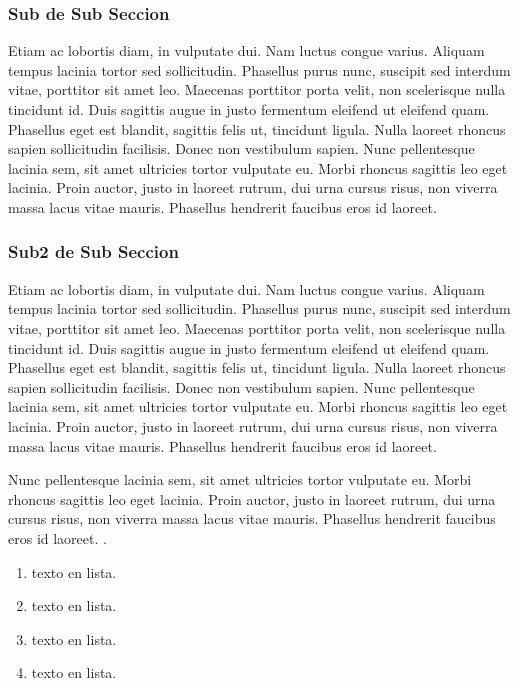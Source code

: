 \subsubsection{Sub de Sub Seccion}


Etiam ac lobortis diam, in vulputate dui. Nam luctus congue varius. Aliquam tempus lacinia tortor sed sollicitudin. Phasellus purus nunc, suscipit sed interdum vitae, porttitor sit amet leo. Maecenas porttitor porta velit, non scelerisque nulla tincidunt id. Duis sagittis augue in justo fermentum eleifend ut eleifend quam. Phasellus eget est blandit, sagittis felis ut, tincidunt ligula. Nulla laoreet rhoncus sapien sollicitudin facilisis. Donec non vestibulum sapien. Nunc pellentesque lacinia sem, sit amet ultricies tortor vulputate eu. Morbi rhoncus sagittis leo eget lacinia. Proin auctor, justo in laoreet rutrum, dui urna cursus risus, non viverra massa lacus vitae mauris. Phasellus hendrerit faucibus eros id laoreet. 


\subsubsection{Sub2 de Sub Seccion}


Etiam ac lobortis diam, in vulputate dui. Nam luctus congue varius. Aliquam tempus lacinia tortor sed sollicitudin. Phasellus purus nunc, suscipit sed interdum vitae, porttitor sit amet leo. Maecenas porttitor porta velit, non scelerisque nulla tincidunt id. Duis sagittis augue in justo fermentum eleifend ut eleifend quam. Phasellus eget est blandit, sagittis felis ut, tincidunt ligula. Nulla laoreet rhoncus sapien sollicitudin facilisis. Donec non vestibulum sapien. Nunc pellentesque lacinia sem, sit amet ultricies tortor vulputate eu. Morbi rhoncus sagittis leo eget lacinia. Proin auctor, justo in laoreet rutrum, dui urna cursus risus, non viverra massa lacus vitae mauris. Phasellus hendrerit faucibus eros id laoreet.  

 Nunc pellentesque lacinia sem, sit amet ultricies tortor vulputate eu. Morbi rhoncus sagittis leo eget lacinia. Proin auctor, justo in laoreet rutrum, dui urna cursus risus, non viverra massa lacus vitae mauris. Phasellus hendrerit faucibus eros id laoreet.  .

\begin{enumerate}[label=(\arabic*)] 
\item texto en lista. 
\item texto en lista. 
\item texto en lista. 
\item texto en lista. 

\end{enumerate}

